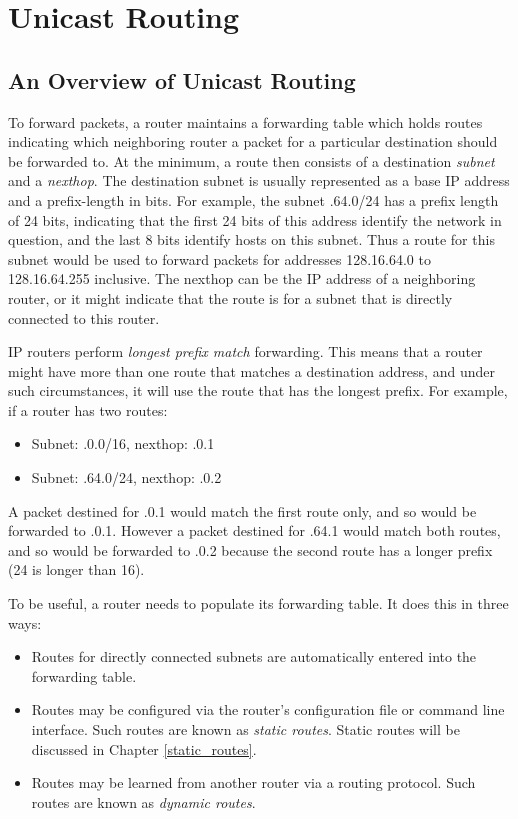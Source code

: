 %
%

\chapter{Unicast Routing}

\section{An Overview of Unicast Routing}

To forward packets, a router maintains a forwarding table which holds
routes indicating which neighboring router a packet for a particular
destination should be forwarded to.  At the minimum, a route then
consists of a destination {\it subnet} and a {\it nexthop}.  The destination
subnet is usually represented as a base IP address and a prefix-length
in bits.  For example, the subnet {.64.0/24} has a prefix
length of 24 bits, indicating that the first 24 bits of this address
identify the network in question, and the last 8 bits identify hosts
on this subnet.  Thus a route for this subnet would be used to forward
packets for addresses 128.16.64.0 to 128.16.64.255 inclusive.  The
nexthop can be the IP address of a neighboring router, or it might
indicate that the route is for a subnet that is directly connected to
this router.

IP routers perform {\it longest prefix match} forwarding.  This means
that a router might have more than one route that matches a
destination address, and under such circumstances, it will use the
route that has the longest prefix.   For example, if a router has two routes:
\begin{itemize}
\item Subnet: {.0.0/16}, nexthop: {.0.1}
\item Subnet: {.64.0/24}, nexthop: {.0.2}
\end{itemize}
\noindent A packet destined for {.0.1} would match the first
route only, and so would be forwarded to {.0.1}.  However a
packet destined for {.64.1} would match both routes, and so
would be forwarded to {.0.2} because the second route has a
longer prefix (24 is longer than 16).

To be useful, a router needs to populate its forwarding table.  It
does this in three ways:
\begin{itemize}
\item Routes for directly connected subnets are automatically entered into
the forwarding table.
\item Routes may be configured via the router's configuration file or
command line interface.  Such routes are known as {\it static
routes}. Static routes will be discussed in Chapter \ref{static_routes}.
\item Routes may be learned from another router via a routing
protocol.  Such routes are known as {\it dynamic routes}.
\end{itemize}

